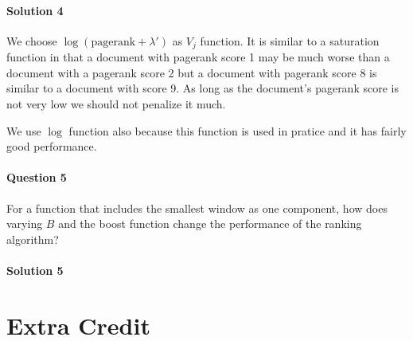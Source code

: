 \documentclass{article}
\begin{document}
\paragraph{Solution 4}
We choose $\log (\mbox{pagerank} + \lambda')$ as $V_j$ function. It is similar to a saturation function in that a document with pagerank score 1 may be much worse than a document with a pagerank score 2 but a document with pagerank score 8 is similar to a document with score 9. As long as the document's pagerank score is not very low we should not penalize it much.

We use $\log$ function also because this function is used in pratice and it has fairly good performance.

\paragraph{Question 5}
For a function that includes the smallest window as one component, how does varying $B$ and the boost function change the performance of the ranking algorithm?

\vspace{-3mm}
\paragraph{Solution 5}


\section{Extra Credit}
\end{document}
